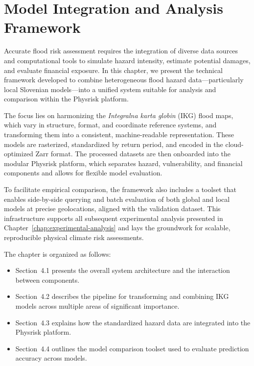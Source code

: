 \chapter{Model Integration and Analysis Framework}
\label{chap:model-integration-and-analysis-framework}

Accurate flood risk assessment requires the integration of diverse data sources and computational tools to simulate hazard intensity, estimate potential damages, and evaluate financial exposure. In this chapter, we present the technical framework developed to combine heterogeneous flood hazard data—particularly local Slovenian models—into a unified system suitable for analysis and comparison within the Physrisk platform.

The focus lies on harmonizing the \textit{Integralna karta globin} (IKG) flood maps, which vary in structure, format, and coordinate reference systems, and transforming them into a consistent, machine-readable representation. These models are rasterized, standardized by return period, and encoded in the cloud-optimized Zarr format. The processed datasets are then onboarded into the modular Physrisk platform, which separates hazard, vulnerability, and financial components and allows for flexible model evaluation.

To facilitate empirical comparison, the framework also includes a toolset that enables side-by-side querying and batch evaluation of both global and local models at precise geolocations, aligned with the validation dataset. This infrastructure supports all subsequent experimental analysis presented in Chapter~\ref{chap:experimental-analysis} and lays the groundwork for scalable, reproducible physical climate risk assessments.

The chapter is organized as follows:
\begin{itemize}
    \item Section~4.1 presents the overall system architecture and the interaction between components.
    \item Section~4.2 describes the pipeline for transforming and combining IKG models across multiple areas of significant importance.
    \item Section~4.3 explains how the standardized hazard data are integrated into the Physrisk platform.
    \item Section~4.4 outlines the model comparison toolset used to evaluate prediction accuracy across models.
\end{itemize}

